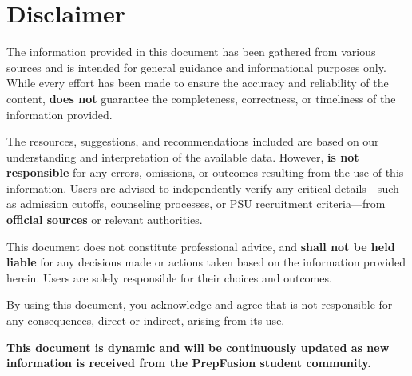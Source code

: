 
\chapter*{Disclaimer}

\begin{disclaimer}
  The information provided in this document has been gathered from various sources
  and is intended for general guidance and informational purposes only. While every
  effort has been made to ensure the accuracy and reliability of the content,
  \PrepFusion \textbf{does not} guarantee the completeness, correctness, or
  timeliness of the information provided.

  The resources, suggestions, and recommendations included are based on our
  understanding and interpretation of the available data. However,
  \PrepFusion \textbf{is not responsible} for any errors, omissions, or outcomes
  resulting from the use of this information. Users are advised to independently
  verify any critical details---such as admission cutoffs, counseling processes,
  or PSU recruitment criteria---from \textbf{official sources} or relevant
  authorities.

  This document does not constitute professional advice, and \PrepFusion
  \textbf{shall not be held liable} for any decisions made or actions taken based
  on the information provided herein. Users are solely responsible for their
  choices and outcomes.

  By using this document, you acknowledge and agree that \PrepFusion is not
  responsible for any consequences, direct or indirect, arising from its use.
\end{disclaimer}

\vspace{1em}
\noindent
\textbf{This document is dynamic and will be continuously updated as new
information is received from the PrepFusion student community.}
